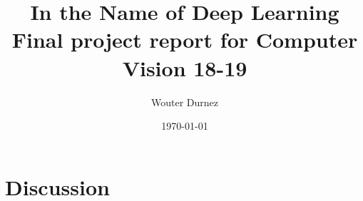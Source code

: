 \documentclass[11pt, a4paper]{article}
\begin{document}


\title{
	\LARGE \textbf{In the Name of Deep Learning} \\
	\vspace{5mm}
	\large Final project report for Computer Vision 18-19
}

\author{Wouter Durnez}
\date{\today}

\maketitle
\tableofcontents
{}
\newpage
{}


















\section{Discussion}
\end{document}

